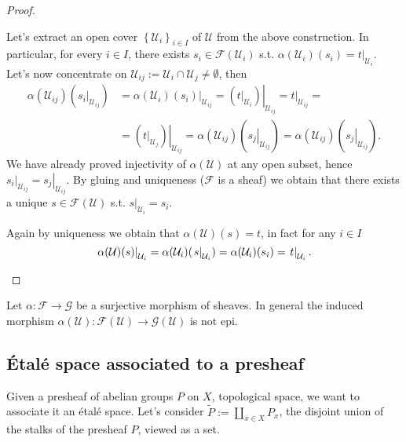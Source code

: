 \documentclass[../Main]{subfiles}
\begin{document}
\begin{proof}
\begin{description}
\begin{itemize}
					Let's extract an open cover $\left\{ \mathcal{U}_i \right\}_{i \in I}$
					of $\mathcal{U}$ from the above construction.
					In particular, for every $i \in I$, there exists
					$s_i \in \mathcal{F}(\mathcal{U}_i)$ s.t.
					$\alpha(\mathcal{U}_i)(s_i) = \left.t\right|_{\mathcal{U}_i}$.
					Let's now concentrate on $\mathcal{U}_{ij} := 
					\mathcal{U}_i \cap \mathcal{U}_j \neq \emptyset$,
					then
					\begin{align}
						\alpha(\mathcal{U}_{ij})(\left.s_i\right|_{\mathcal{U}_{ij}}) &=
						\left.\alpha(\mathcal{U}_i)(s_i)\right|_{\mathcal{U}_{ij}} =
						\left.(\left.t\right|_{\mathcal{U}_i})\right|_{\mathcal{U}_{ij}} =
						\left.t\right|_{\mathcal{U}_{ij}} =\\
									  &=
						\left.(\left.t\right|_{\mathcal{U}_j})\right|_{\mathcal{U}_{ij}} =
						\alpha(\mathcal{U}_{ij})(\left.s_j\right|_{\mathcal{U}_{ij}}) =
						\alpha(\mathcal{U}_{ij})(\left.s_j\right|_{\mathcal{U}_{ij}})
					.\end{align} 
					We have already proved injectivity of $\alpha(\mathcal{U})$
					at any open subset, hence $\left.s_i\right|_{\mathcal{U}_{ij}} =
					\left.s_j\right|_{\mathcal{U}_{ij}}$.
					By gluing and uniqueness ($\mathcal{F}$ is a sheaf)
					we obtain that there exists a unique $s \in \mathcal{F}(\mathcal{U})$
					s.t. $\left.s\right|_{\mathcal{U}_i} = s_i$.

					Again by uniqueness we obtain that $\alpha(\mathcal{U})(s) = t$,
					in fact for any $i \in I$
					\begin{equation}
						\left.\alpha(\mathcal{U})(s)\right|_{\mathcal{U}_i} =
							\alpha(\mathcal{U}_i)(\left.s\right|_{\mathcal{U}_i}) =
						\alpha(\mathcal{U}_i)(s_i) = 
					\left.t\right|_{\mathcal{U}_i}\qedhere 
					.\end{equation} 
			\end{itemize}
	\end{description} 
\end{proof}

\begin{rem}[]
	Let $\alpha\colon \mathcal{F} \to \mathcal{G}$ be a surjective morphism
	of sheaves.
	In general the induced morphism $\alpha \left( \mathcal{U} \right)\colon
	\mathcal{F}(\mathcal{U})\to \mathcal{G}(\mathcal{U})$ is not epi.
\end{rem}

\subsection{Étalé space associated to a presheaf}
Given a presheaf of abelian groups $P$ on $X$, topological space, we want
to associate it an étalé space.
Let's consider $\widetilde{P} := \coprod_{x \in X} P_x$,
the disjoint union of the stalks of the presheaf $P$, viewed as a set.
\end{document}
